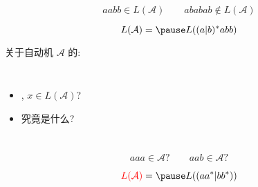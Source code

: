 \begin{frame}{}

  \[
    aabb \in L(\mathcal{A}) \qquad ababab \notin L(\mathcal{A})
  \]

  \pause
  \[
    L(\mathcal{A}) = \pause L((a|b)^{\ast}abb)
  \]
\end{frame}

\begin{frame}{}
  \begin{center}
    关于自动机 $\mathcal{A}$ 的:
  \end{center}

  \vspace{0.60cm}
  \begin{columns}
      \begin{itemize}
        \setlength{\itemsep}{15pt}
        \item {} 
          , $x \in L(\mathcal{A})$?
        \item {} 究竟是什么?
      \end{itemize}
  \end{columns}
\end{frame}

\begin{frame}{}
  \[
    aaa \in \mathcal{A}? \qquad aab \in \mathcal{A}?
  \]

  \[
    \red{L(\mathcal{A})} = \pause L((aa^{\ast}|bb^{\ast}))
  \]
\end{frame}

